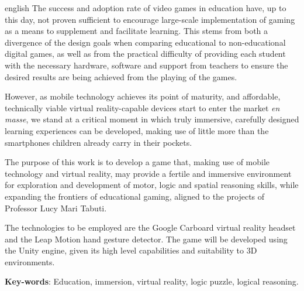 \begin{resumo}[Abstract]
 \begin{otherlanguage*}{english}
   The success and adoption rate of video games in education 
   have, up to this day, not proven sufficient to encourage 
   large-scale implementation of gaming as a means to 
   supplement and facilitate learning. This stems from 
   both a divergence of the design goals when comparing 
   educational to non-educational digital games, as well 
   as from the practical difficulty of providing each student 
   with the necessary hardware, software and support from 
   teachers to ensure the desired results are being achieved 
   from the playing of the games.
   
   However, as mobile technology achieves its point of 
   maturity, and affordable, technically viable virtual 
   reality-capable devices start to enter the market \textit{en 
   masse}, we stand at a critical moment in which truly 
   immersive, carefully designed learning experiences 
   can be developed, making use of little more than the 
   smartphones children already carry in their pockets.
   
   The purpose of this work is to develop a game that, 
   making use of mobile technology and virtual reality, 
   may provide a fertile and immersive environment for 
   exploration and development of motor, logic and spatial 
   reasoning skills, while expanding the frontiers of 
   educational gaming, aligned to the projects of 
   Professor Lucy Mari Tabuti.
   
   The technologies to be employed are the 
   Google Carboard virtual reality headset and the 
   Leap Motion hand gesture detector. The game will be 
   developed using the Unity engine, given its high level 
   capabilities and suitability to 3D environments.

    \vspace{\onelineskip}

    \noindent
    \textbf{Key-words}: Education, immersion, virtual reality, logic puzzle, logical reasoning.
  \end{otherlanguage*}
\end{resumo}